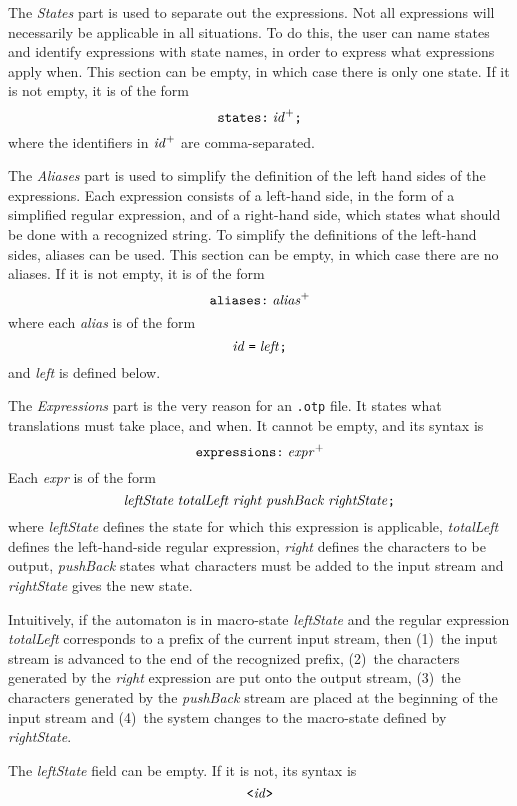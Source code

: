 \documentclass[fleqn]{article}
\newcommand{\mymathtt}[1]{\mbox{\texttt{#1}}}
\newcommand{\mymathit}[1]{\mbox{\emph{#1}}}
\begin{document}
The \emph{States} part is used to separate out the expressions.  Not
all expressions will necessarily be applicable in all situations.
To do this, the user can name states and identify expressions with
state names, in order to express what expressions apply when.
This section can be empty, in which case there is only one state.  If
it is not empty, it is of the form
\[ \mymathtt{states:}\; \mymathit{id}^+\mymathtt{;} \]
where the identifiers in $\mymathit{id}^+$ are comma-separated.

The \emph{Aliases} part is used to simplify the definition of the left
hand sides of the expressions.  Each expression consists of a 
left-hand side, in the form of a simplified regular expression, and of a
right-hand side, which states what should be done with a recognized
string.  To simplify the definitions of the left-hand sides,
aliases can be used. This section can be empty, in which case there
are no aliases.  If it is not empty, it is of the form
\[ \mymathtt{aliases:}\; \mymathit{alias}^+ \]
where each \emph{alias} is of the form
\[ \mymathit{id}\;\mymathtt{=}\;\mymathit{left}\mymathtt{;}\]
and \emph{left} is defined below.

The \emph{Expressions} part is the very reason for an \verb|.otp|
file.  It states what translations must take place, and when.  It
cannot be empty, and its syntax is
\[ \mymathtt{expressions:}\; \mymathit{expr}^+ \]
Each \emph{expr} is of the form
\[
   \mymathit{leftState}\; \mymathit{totalLeft}\; 
   \mymathit{right} \; \mymathit{pushBack} \; \mymathit{rightState} \mymathtt{;}
\]
where \emph{leftState} defines the state for which this expression is
applicable, \emph{totalLeft} defines the left-hand-side regular
expression, \emph{right} defines the characters to be output,
\emph{pushBack} states what characters must be added to the input
stream and \emph{rightState} gives the new state.

Intuitively, if the automaton is in macro-state \emph{leftState} and
the regular expression \emph{totalLeft} corresponds to a prefix of the current
input stream, then (1)~the input stream is advanced to the end of the recognized
prefix, (2)~the characters generated by the \emph{right}
expression are put onto the output stream, (3)~the characters
generated by the \emph{pushBack} stream are placed at the beginning
of the input stream and (4)~the system changes to the macro-state
defined by \emph{rightState}.

The \emph{leftState} field can be empty.  If it is not, its syntax is
\[ \mymathtt{<} \mymathit{id} \mymathtt{>} \]
\end{document}
